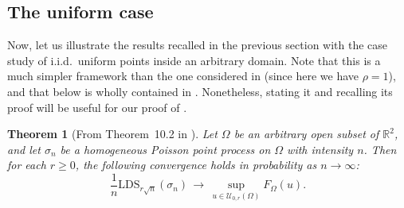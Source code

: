 \documentclass{article}
\newtheorem{theorem}{Theorem}[section]
\theoremstyle{remark}
\def\R{\mathbb{R}}
\def\LDS{\mathrm{LDS}}
\def\Usjo{\mathcal{U}}
\begin{document}
\subsection{The uniform case}\label{sec: proof RS uniform}

Now, let us illustrate the results recalled in the previous section with the case study of i.i.d.~uniform points inside an arbitrary domain.
Note that this is a much simpler framework than the one considered in \cite{S23} (since here we have $\rho=1$), and that  below is wholly contained in \cite[Theorem~10.2]{S23}.
Nonetheless, stating it and recalling its proof will be useful for our proof of .

\begin{theorem}[From Theorem~10.2 in \cite{S23}]\label{th: limit shape uniform PPP on arbitrary domain}
    Let $\Omega$ be an arbitrary open subset of $\R^2$, and let $\sigma_n$ be a homogeneous Poisson point process on $\Omega$ with intensity $n$.
    Then for each $r\ge0$, the following convergence holds in probability as $n\to\infty$:
    \[
        \frac1n \LDS_{r\sqrt n}(\sigma_n) 
        \,\longrightarrow\,
        \sup_{u\in\Usjo_{0,r}(\Omega)} F_{\Omega}(u) .
    \]
\end{theorem}
\end{document}
